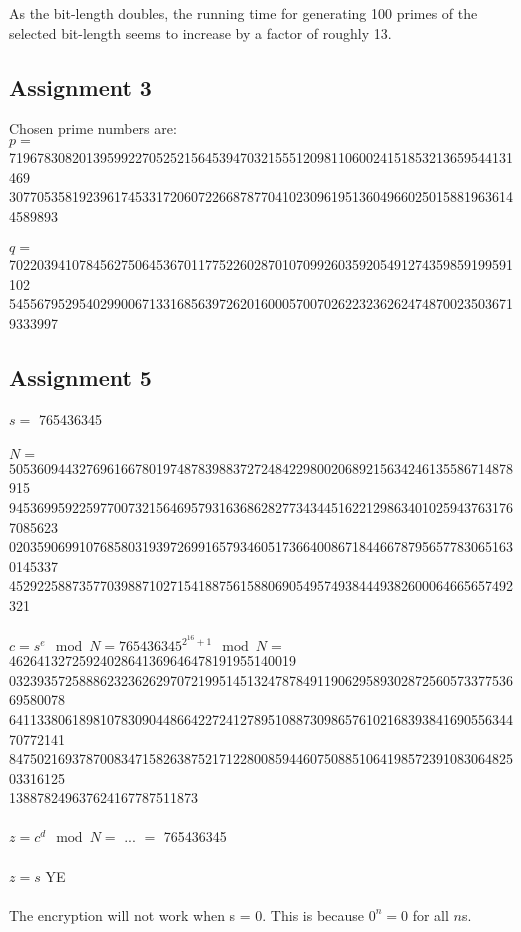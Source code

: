\documentclass[11pt,a4paper]{article}
\begin{document}
As the bit-length doubles, the running time for generating 100 primes of the selected bit-length seems to increase by a factor of roughly 13.

\subsection{Assignment 3}
Chosen prime numbers are: \\
$p = $ 719678308201395992270525215645394703215551209811060024151853213659544131469\\3077053581923961745331720607226687877041023096195136049660250158819636144589893\\\\
$q = $ 702203941078456275064536701177522602870107099260359205491274359859199591102\\5455679529540299006713316856397262016000570070262232362624748700235036719333997
\subsection{Assignment 5}
$s = $ 765436345
\\\\$N =$ 505360944327696166780197487839883727248422980020689215634246135586714878915\\9453699592259770073215646957931636862827734344516221298634010259437631767085623\\0203590699107685803193972699165793460517366400867184466787956577830651630145337\\452922588735770398871027154188756158806905495749384449382600064665657492321 
\\\\$c = s^e\mod N = 765436345^{2^{16}+1} \mod N = $ 46264132725924028641369646478191955140019\\03239357258886232362629707219951451324787849119062958930287256057337753669580078\\64113380618981078309044866422724127895108873098657610216839384169055634470772141\\84750216937870083471582638752171228008594460750885106419857239108306482503316125\\138878249637624167787511873
\\\\$z = c^d\mod N = $ ... $ = $ 765436345
\\\\$z = s$ YE
\\\\ 
The encryption will not work when s = 0. This is because $0^n = 0$ for all $n$s.
\end{document}
